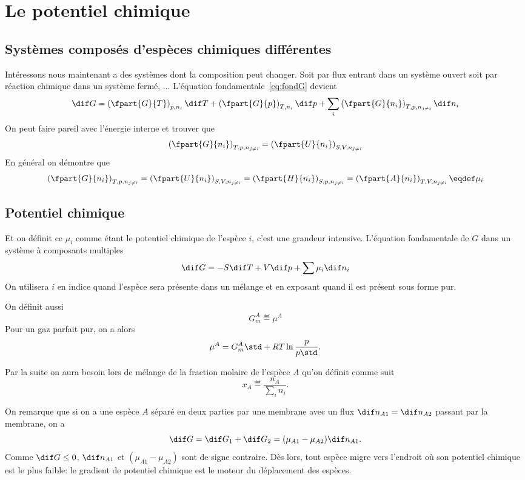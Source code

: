 \section{Le potentiel chimique}
\subsection{Systèmes composés d'espèces chimiques différentes}
Intéressons nous maintenant a des systèmes dont la composition peut changer.
Soit par flux entrant dans un système ouvert
soit par réaction chimique dans un système fermé, ...
L'équation fondamentale~\eqref{eq:fondG} devient
\[ \dif G = \left(\fpart{G}{T}\right)_{p,n_i}\dif T +
\left(\fpart{G}{p}\right)_{T,n_i}\dif p +
\sum_i \left(\fpart{G}{n_i}\right)_{T,p,n_{j\neq i}}\dif n_i \]
On peut faire pareil avec l'énergie interne et trouver que
\[ \left(\fpart{G}{n_i}\right)_{T,p,n_{j\neq i}} =
\left(\fpart{U}{n_i}\right)_{S,V,n_{j\neq i}} \]
En général on démontre que
\[ \left(\fpart{G}{n_i}\right)_{T,p,n_{j\neq i}} =
\left(\fpart{U}{n_i}\right)_{S,V,n_{j\neq i}} =
\left(\fpart{H}{n_i}\right)_{S,p,n_{j\neq i}} =
\left(\fpart{A}{n_i}\right)_{T,V,n_{j\neq i}} \eqdef \mu_i \]

\subsection{Potentiel chimique}
Et on définit ce $\mu_i$ comme étant le potentiel chimique de l'espèce $i$,
c'est une grandeur intensive.
L'équation fondamentale de $G$ dans un système à composants multiples
\[ \dif G = -S\dif T+V\dif p+\sum \mu_i\dif n_i \]
On utilisera $i$ en indice quand l'espèce sera présente dans un mélange et
en exposant quand il est présent sous forme pur.

On définit aussi
\[ G_m^A \eqdef \mu^A \] %
Pour un gaz parfait pur, on a alors
\[ \mu^A = {G_m^A}\std+RT \ln \frac{p}{p\std}. \]

Par la suite on aura besoin lors de mélange de la fraction molaire de
l'espèce $A$ qu'on définit comme suit
\[ x_A \eqdef \frac{n_A}{\sum_in_i}. \] %

On remarque que si on a une espèce $A$ séparé en deux parties par une membrane
avec un flux $\dif n_{A1} = \dif n_{A2}$ passant par la membrane,
on a
\[ \dif G = \dif G_1 + \dif G_2 = (\mu_{A1} - \mu_{A2})\dif n_{A1}. \]
Comme $\dif G \leq 0$, $\dif n_{A1}$ et $(\mu_{A1} - \mu_{A2})$ sont
de signe contraire.
Dès lors,
tout espèce migre vers l'endroit où son potentiel chimique est le plus faible:
le gradient de potentiel chimique est le moteur du déplacement des espèces.

